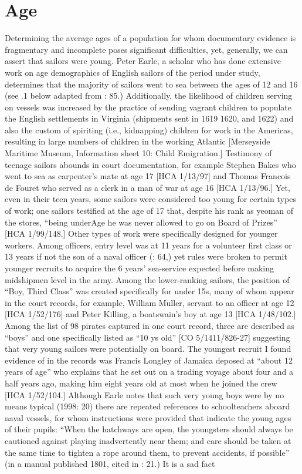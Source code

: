 \section{\textbf{Age}}%

  Determining the average ages of a population for whom documentary evidence is fragmentary and incomplete poses significant difficulties, yet, generally, we can assert that sailors were young. Peter Earle, a scholar who has done extensive work on age demographics of English sailors of the period under study, determines that the majority of sailors went to sea between the ages of 12 and 16 (see .1 below adapted from \citealt{Earle1993}: 85.) Additionally, the likelihood of children serving on vessels was increased by the practice of sending vagrant children to populate the English settlements in Virginia (shipments sent in 1619 1620, and 1622) and also the custom of spiriting (i.e., kidnapping) children for work in the Americas, resulting in large numbers of children in the working Atlantic [Merseyside Maritime Museum, Information sheet 10: Child Emigration.] Testimony of teenage sailors abounds in court documentation, for example Stephen Bakes who went to sea as carpenter’s mate at age 17 [HCA 1/13/97] and Thomas Francois de Fouret who served as a clerk in a man of war at age 16 [HCA 1/13/96.] Yet, even in their teen years, some sailors were considered too young for certain types of work; one sailors testified at the age of 17 that, despite his rank as yeoman of the stores, “being underAge he was never allowed to go on Board of Prizes” [HCA 1/99/148.] Other types of work were specifically designed for younger workers. Among officers, entry level was at 11 years for a volunteer first class or 13 years if not the son of a naval officer (\citealt{AdkinsAdkins2008}: 64,) yet rules were broken to permit younger recruits to acquire the 6 years’ sea-service expected before making midshipmen level in the army. Among the lower-ranking sailors, the position of “Boy, Third Class” was created specifically for under 15s, many of whom appear in the court records, for example, William Muller, servant to an officer at age 12 [HCA 1/52/176] and Peter Killing, a boatswain's boy at age 13 [HCA 1/48/102.] Among the list of 98 pirates captured in one court record, three are described as “boys” and one specifically listed as “10 ys old” [CO 5/1411/826-27] suggesting that very young sailors were potentially on board. The youngest recruit I found evidence of in the records was Francis Longley of Jamaica deposed at “about 12 years of age” who explains that he set out on a trading voyage about four and a half years ago, making him eight years old at most when he joined the crew [HCA 1/52/104.] Although Earle notes that such very young boys were by no means typical (1998: 20) there are repeated references to schoolteachers aboard naval vessels, for whom instructions were provided that indicate the young ages of their pupils: “When the hatchways are open, the youngsters should always be cautioned against playing inadvertently near them; and care should be taken at the same time to tighten a rope around them, to prevent accidents, if possible” (in a manual published 1801, cited in \citealt{AdkinsAdkins2008}: 21.) It is a sad fact 